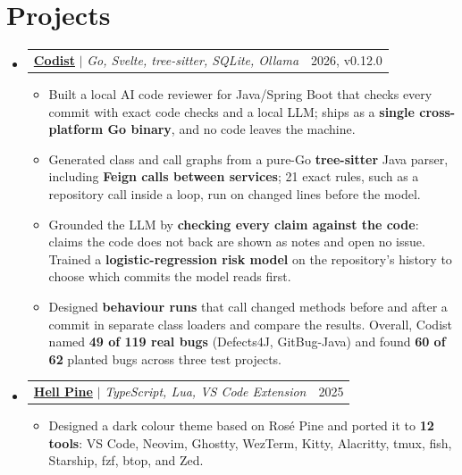 \documentclass[letterpaper,11pt]{article}
\makeatletter
\newcommand{\resumeItem}[1]{\item\small{#1\vspace{-1.5pt}}}
\newcommand{\resumeProject}[3]{
  \vspace{-1pt}\item
    \begin{tabular*}{\linewidth}[t]{l@{\extracolsep{\fill}}r}
      \small\textbf{#1} $|$ \emph{#2} & \small #3 \\
    \end{tabular*}\vspace{-6pt}
}
\newcommand{\resumeListStart}{\begin{itemize}[leftmargin=0.15in, label={}]}
\newcommand{\resumeListEnd}{\end{itemize}}
\newcommand{\resumeItemListStart}{\begin{itemize}[leftmargin=0.18in, itemsep=0pt, topsep=2pt]}
\newcommand{\resumeItemListEnd}{\end{itemize}\vspace{-4pt}}
\makeatother
\begin{document}
\section{Projects}
\resumeListStart
  \resumeProject
    {\href{https://github.com/abxengg/codist}{Codist}}
    {Go, Svelte, tree-sitter, SQLite, Ollama}{2026, v0.12.0}
    \resumeItemListStart
      \resumeItem{Built a local AI code reviewer for Java/Spring Boot that checks every commit with exact code
        checks and a local LLM; ships as a \textbf{single cross-platform Go binary}, and no code leaves the machine.}
      \resumeItem{Generated class and call graphs from a pure-Go \textbf{tree-sitter} Java parser, including
        \textbf{Feign calls between services}; 21 exact rules, such as a repository call inside a loop, run on
        changed lines before the model.}
      \resumeItem{Grounded the LLM by \textbf{checking every claim against the code}: claims the code does not back
        are shown as notes and open no issue. Trained a \textbf{logistic-regression risk model} on the repository's
        history to choose which commits the model reads first.}
      \resumeItem{Designed \textbf{behaviour runs} that call changed methods before and after a commit in separate
        class loaders and compare the results. Overall, Codist named \textbf{49 of 119 real bugs} (Defects4J, GitBug-Java) and found
        \textbf{60 of 62} planted bugs across three test projects.}
    \resumeItemListEnd
  \resumeProject
    {\href{https://github.com/abxengg/hell-pine}{Hell Pine}}
    {TypeScript, Lua, VS Code Extension}{2025}
    \resumeItemListStart
      \resumeItem{Designed a dark colour theme based on Ros\'e Pine and ported it to \textbf{12 tools}: VS Code,
        Neovim, Ghostty, WezTerm, Kitty, Alacritty, tmux, fish, Starship, fzf, btop, and Zed.}
    \resumeItemListEnd
\resumeListEnd

\end{document}
